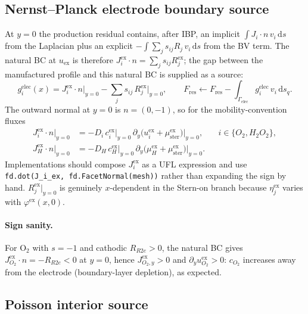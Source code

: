 \documentclass[11pt]{article}
\newcommand{\elec}{\mathrm{elec}}
\newcommand{\ster}{\mathrm{ster}}
\begin{document}
\subsection{Nernst--Planck electrode boundary source}

At $y=0$ the production residual contains, after IBP, an implicit
$\int J_i \cdot n\, v_i\, \mathrm{d}s$ from the Laplacian plus an explicit
$-\int \sum_j s_{ij} R_j\, v_i\, \mathrm{d}s$ from the BV term. The natural
BC at $u_\mathrm{ex}$ is therefore $J_i^\mathrm{ex} \cdot n =
\sum_j s_{ij} R_j^\mathrm{ex}$; the gap between the manufactured profile and
this natural BC is supplied as a source:
\begin{equation}
\boxed{
  g_i^\elec(x) = J_i^\mathrm{ex}\cdot n\bigl|_{y=0}
               - \sum_j s_{ij}\, R_j^\mathrm{ex}\bigl|_{y=0},
  \qquad
  F_\mathrm{res} \leftarrow F_\mathrm{res}
                       - \int_{\Gamma_\elec} g_i^\elec\, v_i\, \mathrm{d}s_q.
}
\end{equation}
The outward normal at $y=0$ is $n = (0,-1)$, so for the
mobility-convention fluxes
\begin{align}
  J_i^\mathrm{ex} \cdot n\bigl|_{y=0}
   &= -D_i\, c_i^\mathrm{ex}\bigl|_{y=0}\,
       \partial_y\!\bigl(u_i^\mathrm{ex} + \mu_\ster^\mathrm{ex}\bigr)\bigl|_{y=0},
   && i \in \{O_2, H_2O_2\}, \\
  J_H^\mathrm{ex} \cdot n\bigl|_{y=0}
   &= -D_H\, c_H^\mathrm{ex}\bigl|_{y=0}\,
       \partial_y\!\bigl(\mu_H^\mathrm{ex} + \mu_\ster^\mathrm{ex}\bigr)\bigl|_{y=0}.
\end{align}
Implementations should compose $J_i^\mathrm{ex}$ as a UFL expression and
use \verb|fd.dot(J_i_ex, fd.FacetNormal(mesh))| rather than expanding the
sign by hand. $R_j^\mathrm{ex}|_{y=0}$ is genuinely $x$-dependent in
the Stern-on branch because $\eta_j^\mathrm{ex}$ varies with
$\varphi^\mathrm{ex}(x,0)$.

\paragraph{Sign sanity.} For $\mathrm{O_2}$ with $s = -1$ and cathodic
$R_{R2e} > 0$, the natural BC gives $J_{O_2}^\mathrm{ex} \cdot n = -R_{R2e} < 0$
at $y=0$, hence $J_{O_2,y}^\mathrm{ex} > 0$ and
$\partial_y u_{O_2}^\mathrm{ex} > 0$: $c_{O_2}$ increases away from the
electrode (boundary-layer depletion), as expected.

\subsection{Poisson interior source}
\end{document}
